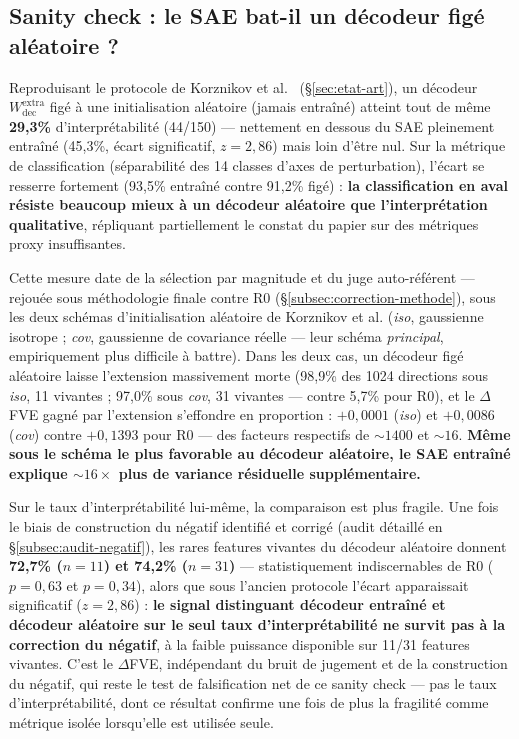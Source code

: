 \documentclass[11pt]{article}
\begin{document}
\subsection{Sanity check : le SAE bat-il un décodeur figé aléatoire ?}
\label{subsec:sanity-check-resultats}

Reproduisant le protocole de Korznikov et al.~\cite{korznikov2025sanitychecks}
(\S\ref{sec:etat-art}), un décodeur $W_\text{dec}^\text{extra}$ figé à une
initialisation aléatoire (jamais entraîné) atteint tout de même
\textbf{29,3\%} d'interprétabilité (44/150) --- nettement en dessous du SAE
pleinement entraîné (45,3\%, écart significatif, $z=2,86$) mais loin d'être
nul. Sur la métrique de classification (séparabilité des 14 classes d'axes
de perturbation), l'écart se resserre fortement (93,5\% entraîné contre
91,2\% figé) : \textbf{la classification en aval résiste beaucoup mieux à un
décodeur aléatoire que l'interprétation qualitative}, répliquant partiellement
le constat du papier sur des métriques proxy insuffisantes.

Cette mesure date de la sélection par magnitude et du juge auto-référent ---
rejouée sous méthodologie finale contre R0 (\S\ref{subsec:correction-methode}),
sous les deux schémas d'initialisation aléatoire de Korznikov et al.
(\emph{iso}, gaussienne isotrope ; \emph{cov}, gaussienne de covariance
réelle --- leur schéma \emph{principal}, empiriquement plus difficile à
battre). Dans les deux cas, un décodeur figé aléatoire laisse l'extension
massivement morte (98,9\% des 1024 directions sous \emph{iso}, 11 vivantes ;
97,0\% sous \emph{cov}, 31 vivantes --- contre 5,7\% pour R0), et le
$\Delta$FVE gagné par l'extension s'effondre en proportion : $+0{,}0001$
(\emph{iso}) et $+0{,}0086$ (\emph{cov}) contre $+0{,}1393$ pour R0 --- des
facteurs respectifs de ${\sim}1400$ et ${\sim}16$. \textbf{Même sous le
schéma le plus favorable au décodeur aléatoire, le SAE entraîné explique
${\sim}16\times$ plus de variance résiduelle supplémentaire.}

Sur le taux d'interprétabilité lui-même, la comparaison est plus fragile.
Une fois le biais de construction du négatif identifié et corrigé (audit
détaillé en \S\ref{subsec:audit-negatif}), les rares features vivantes du
décodeur aléatoire donnent \textbf{72,7\% ($n=11$) et 74,2\% ($n=31$)} ---
statistiquement indiscernables de R0 ($p=0{,}63$ et $p=0{,}34$), alors que
sous l'ancien protocole l'écart apparaissait significatif ($z=2{,}86$) :
\textbf{le signal distinguant décodeur entraîné et décodeur aléatoire sur le
seul taux d'interprétabilité ne survit pas à la correction du négatif}, à la
faible puissance disponible sur 11/31 features vivantes. C'est le
$\Delta$FVE, indépendant du bruit de jugement et de la construction du
négatif, qui reste le test de falsification net de ce sanity check --- pas
le taux d'interprétabilité, dont ce résultat confirme une fois de plus la
fragilité comme métrique isolée lorsqu'elle est utilisée seule.
\end{document}
